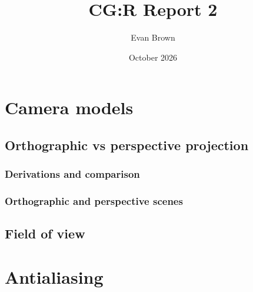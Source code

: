 \documentclass{article}
\title{CG:R Report 2}
\author{Evan Brown}
\date{October 2026}
\begin{document}
\maketitle

\section{Camera models}
\subsection{Orthographic vs perspective projection}
\subsubsection{Derivations and comparison}
\subsubsection{Orthographic and perspective scenes}

\subsection{Field of view}

\section{Antialiasing}

\end{document}
